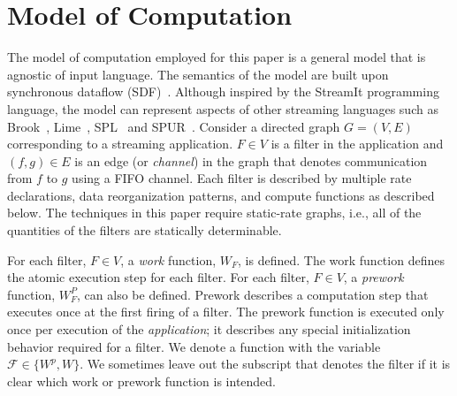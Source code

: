 \section{Model of Computation}
\label{model}

The model of computation employed for this paper is a general model
that is agnostic of input language.  The semantics of the model are
built upon synchronous dataflow (SDF)~\cite{leeSDF}.  Although
inspired by the StreamIt programming language, the model can represent
aspects of other streaming languages such as Brook~\cite{brook04},
Lime~\cite{lime10}, SPL~\cite{spl09} and SPUR~\cite{spur05samos}.
Consider a directed graph $G = (V, E)$ corresponding to a streaming
application. $F \in V$ is a filter in the application and $(f, g) \in
E$ is an edge (or {\it channel}) in the graph that denotes
communication from $f$ to $g$ using a FIFO channel.  Each filter is
described by multiple rate declarations, data reorganization patterns,
and compute functions as described below. The techniques in this paper
require static-rate graphs, i.e., all of the quantities of the filters
are statically determinable.



For each filter, $F \in V$, a {\it work} function, $W_F$, is defined.
The work function defines the atomic execution step for each filter.
For each filter, $F \in V$, a {\it prework} function, $W_F^P$, can
also be defined.  Prework describes a computation step that executes
once at the first firing of a filter.  The prework function is
executed only once per execution of the {\it application}; it
describes any special initialization behavior required for a
filter. We denote a function with the variable $\mathcal{F} \in \{W^p,
W\}$.  We sometimes leave out the subscript that denotes the filter if
it is clear which work or prework function is intended.

